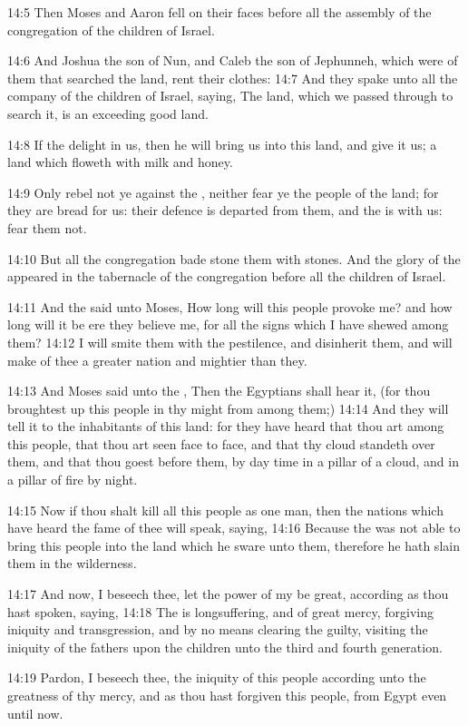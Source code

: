 14:5 Then Moses and Aaron fell on their faces before all the assembly
of the congregation of the children of Israel.

14:6 And Joshua the son of Nun, and Caleb the son of Jephunneh, which
were of them that searched the land, rent their clothes: 14:7 And they
spake unto all the company of the children of Israel, saying, The
land, which we passed through to search it, is an exceeding good land.

14:8 If the \LORD delight in us, then he will bring us into this land,
and give it us; a land which floweth with milk and honey.

14:9 Only rebel not ye against the \LORD, neither fear ye the people of
the land; for they are bread for us: their defence is departed from
them, and the \LORD is with us: fear them not.

14:10 But all the congregation bade stone them with stones. And the
glory of the \LORD appeared in the tabernacle of the congregation
before all the children of Israel.

14:11 And the \LORD said unto Moses, How long will this people provoke
me?  and how long will it be ere they believe me, for all the signs
which I have shewed among them?  14:12 I will smite them with the
pestilence, and disinherit them, and will make of thee a greater
nation and mightier than they.

14:13 And Moses said unto the \LORD, Then the Egyptians shall hear it,
(for thou broughtest up this people in thy might from among them;)
14:14 And they will tell it to the inhabitants of this land: for they
have heard that thou \LORD art among this people, that thou \LORD art
seen face to face, and that thy cloud standeth over them, and that
thou goest before them, by day time in a pillar of a cloud, and in a
pillar of fire by night.

14:15 Now if thou shalt kill all this people as one man, then the
nations which have heard the fame of thee will speak, saying, 14:16
Because the \LORD was not able to bring this people into the land which
he sware unto them, therefore he hath slain them in the wilderness.

14:17 And now, I beseech thee, let the power of my \LORD be great,
according as thou hast spoken, saying, 14:18 The \LORD is
longsuffering, and of great mercy, forgiving iniquity and
transgression, and by no means clearing the guilty, visiting the
iniquity of the fathers upon the children unto the third and fourth
generation.

14:19 Pardon, I beseech thee, the iniquity of this people according
unto the greatness of thy mercy, and as thou hast forgiven this
people, from Egypt even until now.

